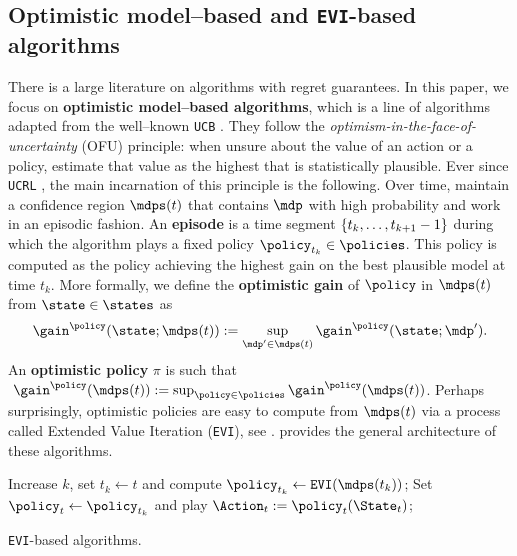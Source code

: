 \documentclass[preprint,cleveref,12pt]{colt2025}
\DeclarePairedDelimiter{\braces}{\{}{\}}	%
\def\model{\mdp}
\def\models{\mdps}
\newcommand{\strong}[1]{\textbf{#1}}
\begin{document}
    \subsection{Optimistic model--based and \texttt{EVI}-based algorithms}
    \label{section_optimistic_model_based}

    There is a large literature on algorithms with regret guarantees. 
    In this paper, we focus on \strong{optimistic model--based algorithms}, which is a line of algorithms adapted from the well--known \texttt{UCB} \cite{auer_using_2002}. 
    They follow the \emph{optimism-in-the-face-of-uncertainty} (OFU) principle: when unsure about the value of an action or a policy, estimate that value as the highest that is statistically plausible. 
    Ever since \texttt{UCRL} \cite{auer_logarithmic_2006}, the main incarnation of this principle is the following.
    Over time, maintain a confidence region $\models(t)$ that contains $\model$ with high probability and work in an episodic fashion.
    An \strong{episode} is a time segment $\braces{t_k, \ldots, t_{k+1}-1}$ during which the algorithm plays a fixed policy $\policy_{t_k} \in \policies$. 
    This policy is computed as the policy achieving the highest gain on the best plausible model at time $t_k$.
    More formally, we define the \strong{optimistic gain} of $\policy$ in $\models(t)$ from $\state \in \states$ as 
    \begin{equation}
    \label{equation_optimistic_gain}
        \gain^\policy(\state; \models(t)) 
        := 
        \sup_{\model' \in \models(t)} \gain^\policy(\state; \model')
        .
    \end{equation}
    An \strong{optimistic policy} $\pi$ is such that $\ \gain^\policy(\models(t)) := \sup_{\policy \in \policies} \gain^\policy(\models(t))$. 
    Perhaps surprisingly, optimistic policies are easy to compute from $\models(t)$ via a process called {Extended Value Iteration} (\texttt{EVI}), see \cite{auer_near_optimal_2009}.
     provides the general architecture of these algorithms. 
    
    \begin{algorithm}[h]
        \begin{algorithmic}[1]
                    \STATE Increase $k$, set $t_k \gets t$ and compute $\policy_{t_k} \gets \texttt{EVI}(\models(t_k))$;
                \ENDIF
                \STATE Set $\policy_t \gets \policy_{t_k}$ and play $\Action_t := \policy_{t}(\State_t)$;
            \ENDFOR
        \end{algorithmic}
        \caption{
            \label{algorithm_optimistic}
            \texttt{EVI}-based algorithms.
        }
    \end{algorithm}
\end{document}
